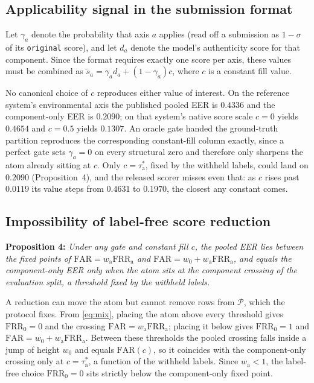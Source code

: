 \documentclass{article}
\begin{document}
\subsection{Applicability signal in the submission format}
\label{sec:applicability}

Let $\gamma_a$
denote the probability that axis $a$ applies (read off a submission as $1-\sigma$ of its \texttt{original} score), and let $d_a$ denote the model's
authenticity score for that component. Since the format requires exactly one score per axis, these values
must be combined as
$\tilde{s}_a = \gamma_a d_a + (1-\gamma_a)c$,
where $c$ is a constant fill value.

No canonical choice of $c$ reproduces either value of interest. On the reference system's environmental axis the published pooled EER is $0.4336$ and the component-only EER is $0.2090$; on that system's native score scale $c=0$ yields $0.4654$ and $c=0.5$ yields $0.1307$. An oracle gate handed the ground-truth partition reproduces the corresponding constant-fill column exactly, since a perfect gate sets $\gamma_a=0$ on every structural zero and therefore only sharpens the atom already sitting at $c$. Only $c=\tau_{\mathrm{a}}^\ast$, fixed by the withheld labels, could land on $0.2090$ (Proposition~4), and the released scorer misses even that: as $c$ rises past $0.0119$ its value steps from $0.4631$ to $0.1970$, the closest any constant comes.

\subsection{Impossibility of label-free score reduction}

\vspace{1pt}\noindent\textbf{Proposition 4: } \emph{Under any gate and constant fill $c$, the pooled EER lies between the fixed points of $\mathrm{FAR}=w_{\mathrm{a}}\mathrm{FRR}_{\mathrm{a}}$ and $\mathrm{FAR}=w_0+w_{\mathrm{a}}\mathrm{FRR}_{\mathrm{a}}$, and equals the component-only EER only when the atom sits at the component crossing of the evaluation split, a threshold fixed by the withheld labels.}

\noindent A reduction can move the atom but cannot remove rows from $\mathcal{P}$, which the protocol fixes. From \eqref{eq:mix}, placing the atom above every threshold gives $\mathrm{FRR}_0=0$ and the crossing $\mathrm{FAR}=w_{\mathrm{a}}\mathrm{FRR}_{\mathrm{a}}$; placing it below gives $\mathrm{FRR}_0=1$ and $\mathrm{FAR}=w_0+w_{\mathrm{a}}\mathrm{FRR}_{\mathrm{a}}$. Between these thresholds the pooled crossing falls inside a jump of height $w_0$ and equals $\mathrm{FAR}(c)$, so it coincides with the component-only crossing only at $c=\tau_{\mathrm{a}}^\ast$, a function of the withheld labels. Since $w_{\mathrm{a}}<1$, the label-free choice $\mathrm{FRR}_0=0$ sits strictly below the component-only fixed point.
\end{document}
